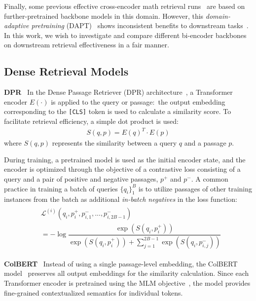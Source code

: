 \documentclass[11pt]{article}
\begin{document}
Finally, some previous effective cross-encoder math retrieval runs~\cite{reusch2021tu_dbs} are based on further-pretrained backbone models in this domain.
However, this \textit{domain-adaptive pretraining} (DAPT)~\cite{gururangan2020dontstoppretrain} shows inconsistent benefits to downstream tasks~\cite{zhu2021notalwayshelp}.
In this work, we wish to investigate and compare different bi-encoder backbones on downstream retrieval effectiveness in a fair manner.

\subsection{Dense Retrieval Models}
\label{sect:models}
\smallskip \noindent
\textbf{DPR} \ 
In the Dense Passage Retriever (DPR) architecture~\cite{karpukhin2020dpr}, a Transformer encoder $E(\cdot)$ is applied to the query or passage:\ the output embedding corresponding to the \texttt{[CLS]} token is used to calculate a similarity score.
To facilitate retrieval efficiency, a simple dot product is used:
\begin{align}
S(q, p) = E(q)^T \cdot E(p)
\end{align}
\noindent where $S(q, p)$ represents the similarity between a query $q$ and a passage $p$.

During training, a pretrained model is used as the initial encoder state, and the encoder is optimized through the objective of a contrastive loss consisting of a query and a pair of positive and negative passages, $p^+$ and $p^-$.
A common practice in training a batch of queries $\{q_i\}^B_1$ is to utilize passages of other training instances from the batch as additional  \textit{in-batch negatives} in the loss function:
\begin{align}
\begin{split}
& \mathcal{L}^{(i)}(q_i, p^+_i, p^-_{i,1}, ..., p^-_{i,2B - 1}) \\
& = - \log \dfrac{\exp\left(S(q_i, p^+_i)\right)}{\exp\left(S(q_i, p^+_i)\right) + \displaystyle\sum_{j=1}^{2B - 1} \exp\left(S(q_i, p^-_{i,j})\right)}
\end{split}
\end{align}

\smallskip \noindent
\textbf{ColBERT} \ Instead of using a single passage-level embedding, the ColBERT model~\cite{khattab2020colbert,santhanam2021colbertv2} preserves all output embeddings for the similarity calculation.
Since each Transformer encoder is pretrained using the MLM objective~\cite{devlin2019bert}, the model provides fine-grained contextualized semantics for individual tokens.
\end{document}
